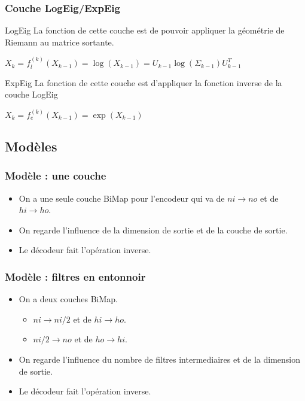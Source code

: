 \documentclass{beamer}
\begin{document}
\begin{frame}
\frametitle{Couche LogEig/ExpEig}

\begin{block}{LogEig}
La fonction de cette couche est de pouvoir appliquer la géométrie de Riemann au matrice sortante.
\end{block}

\begin{center}
    $ X_k = f_l^{(k)}(X_{k-1})=\log (X_{k-1})=U_{k-1}\log(\Sigma_{k-1})U_{k-1}^T$
\end{center}

\begin{block}{ExpEig}
La fonction de cette couche est d'appliquer la fonction inverse de la couche LogEig
\end{block}

\begin{center}
    $ X_k = f_e^{(k)}(X_{k-1})=\exp (X_{k-1})$
\end{center}

\end{frame}
\subsection{Modèles}
\begin{frame}
\frametitle{Modèle : une couche}
\begin{itemize}
    \item On a une seule couche BiMap pour l'encodeur qui va de $ni\rightarrow no$ et de $hi\rightarrow ho$.
    \item On regarde l'influence de la dimension de sortie et de la couche de sortie.
    \item Le décodeur fait l'opération inverse.
\end{itemize}
\begin{center}
    {\tiny
    
    }
\end{center}

\end{frame}

\begin{frame}
\frametitle{Modèle : filtres en entonnoir}
\begin{itemize}
    \item On a deux couches BiMap.
        \begin{itemize}
            \item $ni\rightarrow ni/2$ et de $hi\rightarrow ho$.
            \item $ni/2\rightarrow no$ et de $ho\rightarrow hi$.
        \end{itemize}
    \item On regarde l'influence du nombre de filtres intermediaires et de la dimension de sortie.
    \item Le décodeur fait l'opération inverse.
\end{itemize}
\begin{center}
    {\tiny
    
    }
\end{center}

\end{frame}
\end{document}
